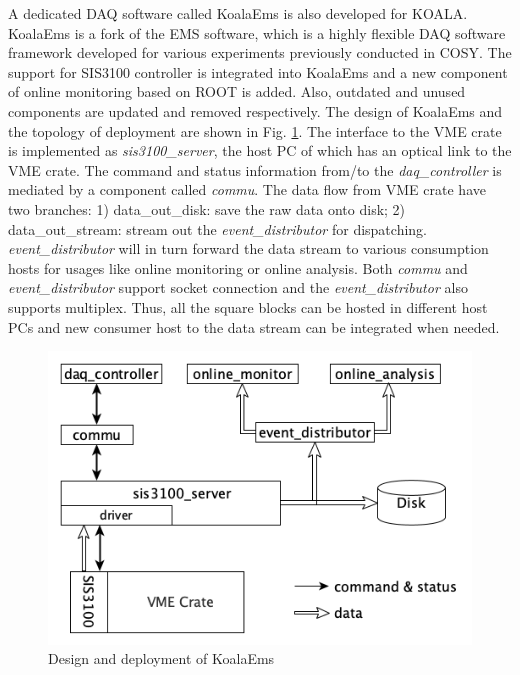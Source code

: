 \documentclass[11pt]{article}
\begin{document}
A dedicated DAQ software called KoalaEms is also developed for KOALA.
KoalaEms is a fork of the EMS software, which is a highly flexible DAQ software framework developed for various experiments previously conducted in COSY.
The support for SIS3100 controller is integrated into KoalaEms and a new component of online monitoring based on ROOT is added.
Also, outdated and unused components are updated and removed respectively.
The design of KoalaEms and the topology of deployment are shown in Fig. \ref{fig:koalaems_deployment}.
The interface to the VME crate is implemented as \emph{sis3100\_server}, the host PC of which has an optical link to the VME crate.
The command and status information from/to the \emph{daq\_controller} is mediated by a component called \emph{commu}.
The data flow from VME crate have two branches: 1) data\_out\_disk: save the raw data onto disk; 2) data\_out\_stream: stream out the \emph{event\_distributor} for dispatching.
\emph{event\_distributor} will in turn forward the data stream to various consumption hosts for usages like online monitoring or online analysis.
Both \emph{commu} and \emph{event\_distributor} support socket connection and the \emph{event\_distributor} also supports multiplex.
Thus, all the square blocks can be hosted in different host PCs and new consumer host to the data stream can be integrated when needed.

\begin{figure}[htbp]
\centering
\includegraphics[width=.9\linewidth]{./koalaems_deployment.png}
\caption{\label{fig:koalaems_deployment}Design and deployment of KoalaEms}
\end{figure}
\end{document}

